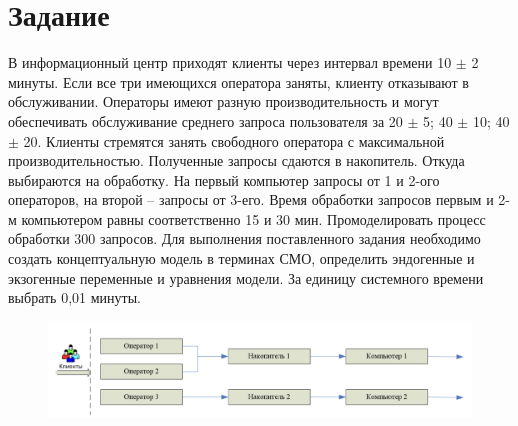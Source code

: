 \documentclass[a4paper, 12pt]{article}
\begin{document}
\section{{Задание}}

\hspace*{5mm} В информационный центр приходят клиенты через интервал времени 10 $\pm$ 2 минуты. Если все три имеющихся оператора заняты, клиенту отказывают в обслуживании. Операторы имеют разную производительность и могут обеспечивать обслуживание среднего запроса пользователя за 20 $\pm$ 5; 40 $\pm$ 10; 40 $\pm$ 20. Клиенты стремятся занять свободного оператора с максимальной производительностью. Полученные запросы сдаются в накопитель. Откуда выбираются на обработку. На первый компьютер запросы от 1 и 2-ого операторов, на второй – запросы от 3-его. Время обработки запросов первым и 2-м компьютером равны соответственно 15 и 30 мин. Промоделировать процесс обработки 300 запросов.
\hspace*{5mm} Для выполнения поставленного задания необходимо создать концептуальную модель в терминах СМО, определить эндогенные и экзогенные переменные и уравнения модели. За единицу системного времени выбрать 0,01 минуты.
\begin{figure}[h!]
	\centering \includegraphics[scale=0.4]{schema}
\end{figure}
\end{document}
